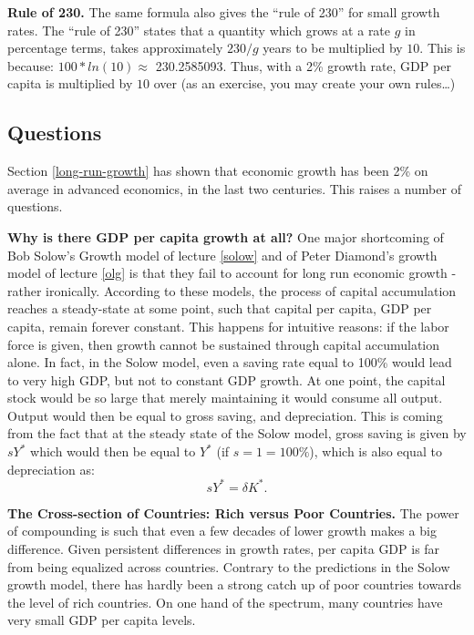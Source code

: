 \documentclass[]{book}
\begin{document}
\textbf{Rule of 230.} The same formula also gives the ``rule of 230''
for small growth rates. The ``rule of 230'' states that a quantity which
grows at a rate \(g\) in percentage terms, takes approximately \(230/g\)
years to be multiplied by \(10\). This is because:
\(100*ln(10) \approx\) 230.2585093. Thus, with a 2\% growth rate, GDP
per capita is multiplied by \(10\) over (as an exercise, you may create
your own rules\ldots{})

\subsection{Questions}\label{questions}

Section \ref{long-run-growth} has shown that economic growth has been
2\% on average in advanced economics, in the last two centuries. This
raises a number of questions.

\textbf{Why is there GDP per capita growth at all?} One major
shortcoming of Bob Solow's Growth model of lecture \ref{solow} and of
Peter Diamond's growth model of lecture \ref{olg} is that they fail to
account for long run economic growth - rather ironically. According to
these models, the process of capital accumulation reaches a steady-state
at some point, such that capital per capita, GDP per capita, remain
forever constant. This happens for intuitive reasons: if the labor force
is given, then growth cannot be sustained through capital accumulation
alone. In fact, in the Solow model, even a saving rate equal to 100\%
would lead to very high GDP, but not to constant GDP growth. At one
point, the capital stock would be so large that merely maintaining it
would consume all output. Output would then be equal to gross saving,
and depreciation. This is coming from the fact that at the steady state
of the Solow model, gross saving is given by \(s Y^{*}\) which would
then be equal to \(Y^{*}\) (if \(s=1=100\%\)), which is also equal to
depreciation as: \[s Y^{*}=\delta K^{*}.\]

\textbf{The Cross-section of Countries: Rich versus Poor Countries.} The
power of compounding is such that even a few decades of lower growth
makes a big difference. Given persistent differences in growth rates,
per capita GDP is far from being equalized across countries. Contrary to
the predictions in the Solow growth model, there has hardly been a
strong catch up of poor countries towards the level of rich countries.
On one hand of the spectrum, many countries have very small GDP per
capita levels.
\end{document}
